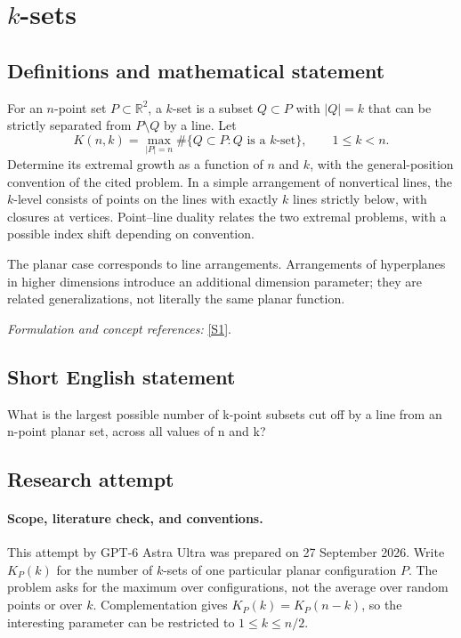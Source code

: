 \documentclass[11pt]{article}
\begin{document}
\section*{\texorpdfstring{$k$-sets}{\$k\$-sets}}\label{5500007}
\subsection{Definitions and mathematical statement}
For an $n$-point set $P\subset{\mathbb{R}}^2$, a $k$-set is a subset $Q\subset P$ with $|Q|=k$ that can be strictly separated from $P\setminus Q$ by a line. Let
\[
 K(n,k)=\max_{|P|=n}\#\{Q\subset P:Q\text{ is a }k\text{-set}
                                      \},\qquad1\le k<n.
\]
Determine its extremal growth as a function of $n$ and $k$, with the general-position convention of the cited problem. In a simple arrangement of nonvertical lines, the $k$-level consists of points on the lines with exactly $k$ lines strictly below, with closures at vertices. Point--line duality relates the two extremal problems, with a possible index shift depending on convention.

The planar case corresponds to line arrangements. Arrangements of hyperplanes in higher dimensions introduce an additional dimension parameter; they are related generalizations, not literally the same planar function.
\par\smallskip\textit{Formulation and concept references:} \href{https://topp.openproblem.net/p7}{[S1]}.

\subsection{Short English statement}
What is the largest possible number of k-point subsets cut off by a line from an n-point planar set, across all values of n and k?
\subsection{Research attempt}
\paragraph{Scope, literature check, and conventions.}
This attempt by GPT-6 Astra Ultra was prepared on 27 September 2026.
Write $K_P(k)$ for the number of $k$-sets of one particular planar
configuration $P$. The problem asks for the maximum over configurations,
not the average over random points or over $k$. Complementation gives
$K_P(k)=K_P(n-k)$, so the interesting parameter can be restricted to
$1\leq k\leq n/2$.
\end{document}
